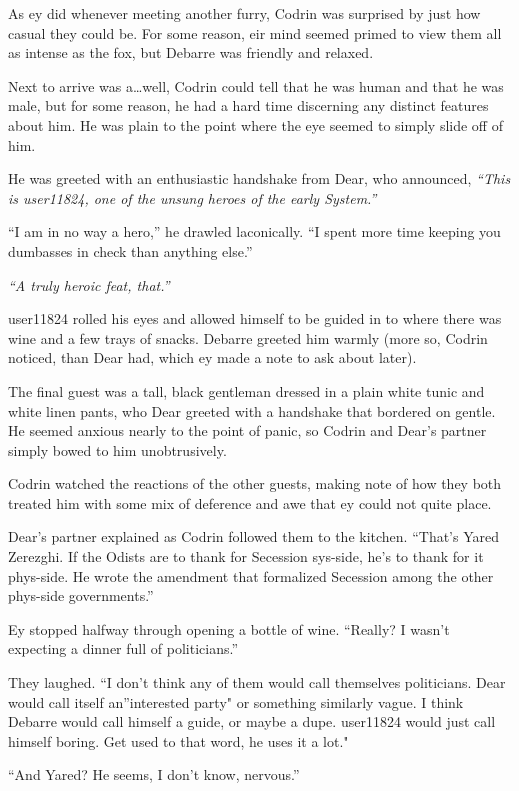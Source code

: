 As ey did whenever meeting another furry, Codrin was surprised by just how casual they could be. For some reason, eir mind seemed primed to view them all as intense as the fox, but Debarre was friendly and relaxed.

Next to arrive was a\ldots well, Codrin could tell that he was human and that he was male, but for some reason, he had a hard time discerning any distinct features about him. He was plain to the point where the eye seemed to simply slide off of him.

He was greeted with an enthusiastic handshake from Dear, who announced, \emph{``This is user11824, one of the unsung heroes of the early System.''}

``I am in no way a hero,'' he drawled laconically. ``I spent more time keeping you dumbasses in check than anything else.''

\emph{``A truly heroic feat, that.''}

user11824 rolled his eyes and allowed himself to be guided in to where there was wine and a few trays of snacks. Debarre greeted him warmly (more so, Codrin noticed, than Dear had, which ey made a note to ask about later).

The final guest was a tall, black gentleman dressed in a plain white tunic and white linen pants, who Dear greeted with a handshake that bordered on gentle. He seemed anxious nearly to the point of panic, so Codrin and Dear's partner simply bowed to him unobtrusively.

Codrin watched the reactions of the other guests, making note of how they both treated him with some mix of deference and awe that ey could not quite place.

Dear's partner explained as Codrin followed them to the kitchen. ``That's Yared Zerezghi. If the Odists are to thank for Secession sys-side, he's to thank for it phys-side. He wrote the amendment that formalized Secession among the other phys-side governments.''

Ey stopped halfway through opening a bottle of wine. ``Really? I wasn't expecting a dinner full of politicians.''

They laughed. ``I don't think any of them would call themselves politicians. Dear would call itself an''interested party" or something similarly vague. I think Debarre would call himself a guide, or maybe a dupe. user11824 would just call himself boring. Get used to that word, he uses it a lot."

``And Yared? He seems, I don't know, nervous.''

